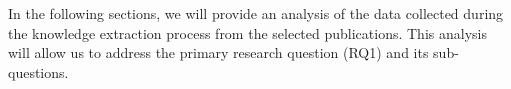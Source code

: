 In the following sections, we will provide an analysis of the data collected
during the knowledge extraction process from the selected publications. This
analysis will allow us to address the primary research question (RQ1) and its
sub-questions.

